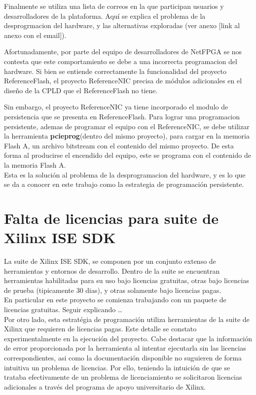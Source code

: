 Finalmente se utiliza una lista de correos en la que participan usuarios y desarrolladores de la plataforma. Aquí se explica el problema de la desprogrmacion del hardware, y las alternativas exploradas (ver anexo [link al anexo con el email]). 

Afortunadamente, por parte del equipo de desarrolladores de NetFPGA se nos contesta que este comportamiento se debe a una incorrecta programacion del hardware. Si bien se entiende correctamente la funcionalidad del proyecto ReferenceFlash, el proyecto ReferenceNIC precisa de módulos adicionales en el diseño de la CPLD que el ReferenceFlash no tiene. 

Sin embargo, el proyecto ReferenceNIC ya tiene incorporado el modulo de persistencia que se presenta en ReferenceFlash. Para lograr una programacion persistente, ademas de programar el equipo con el ReferenceNIC, se debe utilizar la herramienta \textbf{pcieprog}(dentro del mismo proyecto), para cargar en la memoria Flash A, un archivo bitstream con el contenido del mismo proyecto. De esta forma al producirse el encendido del equipo, este se programa con el contenido de la memoria Flash A.\\ 

Esta es la solución al problema de la desprogramacion del hardware, y es lo que se da a conocer en este trabajo como la estrategia de programación persistente.

\section{Falta de licencias para suite de Xilinx ISE SDK}
\label{apendiceB3}

La suite de Xilinx ISE SDK, se componen por un conjunto extenso de herramientas y entornos de desarrollo. Dentro de la suite se encuentran herramientas habilitadas para su uso bajo licencias gratuitas, otras bajo licencias de prueba (tipicamente 30 dias), y otras solamente bajo licencias pagas.\\

En particular en este proyecto se comienza trabajando con un paquete de licencias gratuitas. Seguir explicando \dots\\

Por otro lado, esta estrat\'egia de programaci\'on utiliza herramientas de la suite de Xilinx que requieren de licencias pagas. Este detalle se constato experimentalmente en la ejecuci\'on del proyecto. Cabe destacar que la informaci\'on de error proporcionada por la herramienta al intentar ejecutarla sin las licencias correspondientes, asi como la documentaci\'on disponible no suguieren de forma intuitiva un problema de licencias. Por ello, teniendo la intuici\'on de que se trataba efectivamente de un problema de licenciamiento se solicitaron licencias adicionales a trav\'es del programa de apoyo universitario de Xilinx.


